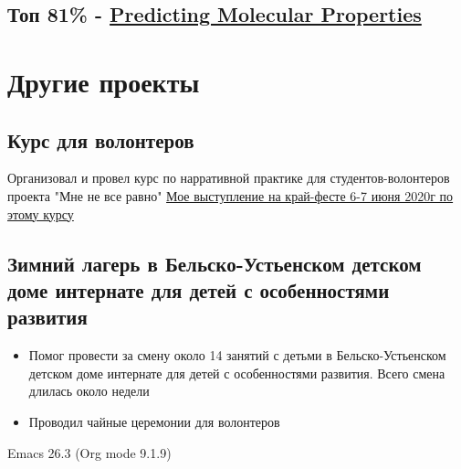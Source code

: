 \documentclass[11pt]{article}
\begin{document}
\subsection{Топ 81\% - \href{https://www.kaggle.com/c/champs-scalar-coupling}{Predicting Molecular Properties}}
\label{sec:org5b80188}
\section{Другие проекты}
\label{sec:org0667f06}
\subsection{Курс для волонтеров}
\label{sec:org4674d49}
Организовал и провел курс по нарративной практике для студентов-волонтеров проекта "Мне не все равно"
\href{https://www.youtube.com/watch?v=EDkDUp0PgPE\&list=PL7GczH8KmOkD5QFvkeFVhJj6aGqpHkmeL\&index=12\&t=0s}{Мое выступление на край-фесте 6-7 июня 2020г по этому курсу}
\subsection{Зимний лагерь в Бельско-Устьенском детском доме интернате для детей с особенностями развития}
\label{sec:org49fd8ac}
\begin{itemize}
\item Помог провести за смену около 14 занятий с детьми в Бельско-Устьенском детском доме интернате для детей с особенностями развития. Всего смена длилась около недели
\item Проводил чайные церемонии для волонтеров
\end{itemize}
Emacs 26.3 (Org mode 9.1.9)
\end{document}
